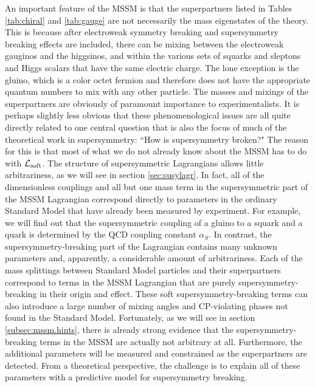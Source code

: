 \documentclass[12pt]{article}
\def\lagr{{\cal L}}
\begin{document}
An important feature of the MSSM is that the superpartners listed in
Tables \ref{tab:chiral} and \ref{tab:gauge} 
are not necessarily the mass eigenstates of the theory.
This is because after electroweak symmetry breaking and supersymmetry
breaking effects are included, there can be mixing between the electroweak
gauginos and the higgsinos, and within the various sets of squarks and
sleptons and Higgs scalars that have the same electric charge. The lone
exception is the gluino, which is a color octet fermion and therefore does
not have the appropriate quantum numbers to mix with any other particle.
The masses and mixings of the superpartners are obviously of paramount
importance to experimentalists. It is perhaps slightly less obvious that
these phenomenological issues are all quite directly related to one
central question that is also the focus of much of the theoretical work in
supersymmetry: ``How is supersymmetry broken?" The reason for this is that
most of what we do not already know about the MSSM has to do with
$\lagr_{\rm soft}$. The structure of supersymmetric Lagrangians allows
little arbitrariness, as we will see in section \ref{sec:susylagr}.
In fact, all of the dimensionless couplings and all but one mass term in
the supersymmetric part of the MSSM Lagrangian correspond directly to
parameters in the ordinary Standard Model that have already been measured
by experiment. For example, we will find out that the supersymmetric
coupling of a gluino to a squark and a quark is determined by the QCD
coupling constant $\alpha_S$. In contrast, the supersymmetry-breaking part
of the Lagrangian contains many unknown parameters and, apparently, a
considerable amount of arbitrariness. Each of the mass splittings between
Standard Model particles and their superpartners correspond to terms in
the MSSM Lagrangian that are purely supersymmetry-breaking in their origin
and effect. These soft supersymmetry-breaking terms can also introduce a
large number of mixing angles and CP-violating phases not found in the
Standard Model. Fortunately, as we will see in section
\ref{subsec:mssm.hints}, there is already strong evidence that the
supersymmetry-breaking terms in the MSSM are actually not arbitrary at
all. Furthermore, the additional parameters will be measured and
constrained as the superpartners are detected. From a theoretical
perspective, the challenge is to explain all of these parameters with a
predictive model for supersymmetry breaking. 
\end{document}
